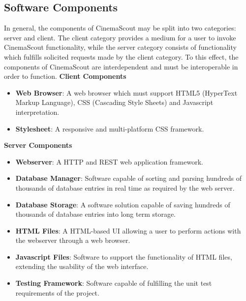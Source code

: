 \documentclass{article}
\begin{document}
\subsection{Software Components}
In general, the components of CinemaScout may be split into two categories: 
server and client. The client category provides a medium for a user to invoke
CinemaScout functionality, while the server category consists of functionality 
which fulfills solicited requests made by the client category. To this effect,
the components of CinemaScout are interdependent and must be interoperable in
order to function.\newline\newline
\textbf{Client Components}
\begin{itemize}
\item \textbf{Web Browser}: A web browser which must support HTML5 (HyperText 
Markup Language), CSS (Cascading Style Sheets) and Javascript interpretation.
\item \textbf{Stylesheet}: A responsive and multi-platform CSS framework.
\end{itemize}
\textbf{Server Components}
\begin{itemize}
\item \textbf{Webserver}: A HTTP and REST web application framework.
\item \textbf{Database Manager}: Software capable of sorting and parsing
hundreds of thousands of database entries in real time as required by the
web server.
\item \textbf{Database Storage}: A software solution capable of saving hundreds
of thousands of database entries into long term storage.
\item \textbf{HTML Files}: A HTML-based UI allowing a user to perform actions
with the webserver through a web browser.
\item \textbf{Javascript Files}: Software to support the functionality of
HTML files, extending the usability of the web interface.
\item \textbf{Testing Framework}: Software capable of fulfilling the unit
test requirements of the project.
\end{itemize}
\end{document}
